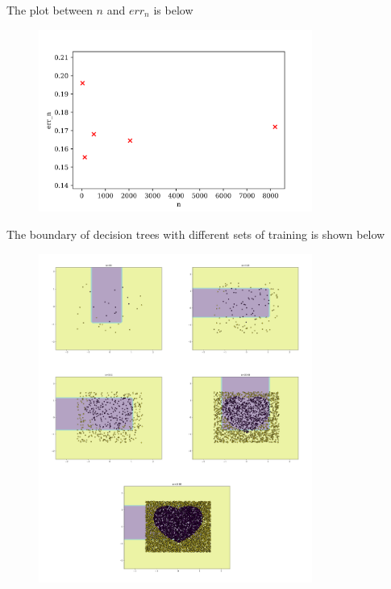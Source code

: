 \documentclass[a4paper]{article}
\theoremstyle{definition}
\begin{document}
\begin{enumerate}
\color{blue}
The plot between $n$ and $err_n$ is below

     \begin{figure}[H]
	       \centering
	        \includegraphics[width=0.8\textwidth]{2_7.png}
	       \captionsetup{labelformat=empty}
	     \caption{}
	       \label{fig:my_label}
	   \end{figure}
	   
The boundary of decision trees with different sets of training is shown below

     \begin{figure}[H]
	       \centering
	        \includegraphics[width=0.8\textwidth]{2_7combined.png}
	       \captionsetup{labelformat=empty}
	     \caption{}
	       \label{fig:my_label}
	   \end{figure}


\end{enumerate}
\end{document}
